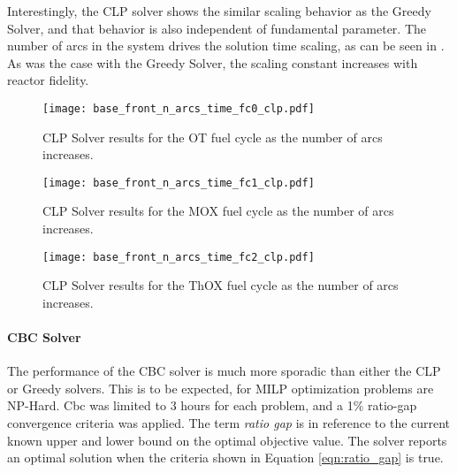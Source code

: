 Interestingly, the CLP solver shows the similar scaling behavior as the Greedy
Solver, and that behavior is also independent of fundamental parameter. The
number of arcs in the system drives the solution time scaling, as can be seen in
. As
was the case with the Greedy Solver, the scaling constant increases with reactor
fidelity.

\begin{figure}[h!]
  \begin{center}
    \texttt{[image: base\_front\_n\_arcs\_time\_fc0\_clp.pdf]}
    \caption{
      \label{fig:base_front_n_arcs_time_fc0_clp}
      CLP Solver results for the OT fuel cycle as the number of arcs
      increases.
      }
  \end{center}
\end{figure}

\begin{figure}[h!]
  \begin{center}
    \texttt{[image: base\_front\_n\_arcs\_time\_fc1\_clp.pdf]}
    \caption{
      \label{fig:base_front_n_arcs_time_fc1_clp}
      CLP Solver results for the MOX fuel cycle as the number of arcs
      increases.
      }
  \end{center}
\end{figure}

\begin{figure}[h!]
  \begin{center}
    \texttt{[image: base\_front\_n\_arcs\_time\_fc2\_clp.pdf]}
    \caption{
      \label{fig:base_front_n_arcs_time_fc2_clp}
      CLP Solver results for the ThOX fuel cycle as the number of arcs
      increases.
      }
  \end{center}
\end{figure}

\paragraph{CBC Solver}

The performance of the CBC solver is much more sporadic than either the CLP or
Greedy solvers. This is to be expected, for MILP optimization problems are
NP-Hard. Cbc was limited to 3 hours for each problem, and a 1\% ratio-gap
convergence criteria was applied. The term \textit{ratio gap} is in reference to
the current known upper and lower bound on the optimal objective value. The
solver reports an optimal solution when the criteria shown in Equation
\ref{eqn:ratio_gap} is true.

